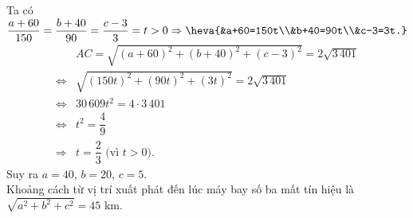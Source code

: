 \begin{bt}
{		Ta có $\dfrac{a+60}{150}=\dfrac{b+40}{90}=\dfrac{c-3}{3}=t>0\Rightarrow \heva{&a+60=150t\\&b+40=90t\\&c-3=3t.}$
		\allowdisplaybreaks
		\begin{align*}
			&A C=\sqrt{(a+60)^2+(b+40)^2+(c-3)^2}=2 \sqrt{3\,401}\\
			\Leftrightarrow &\sqrt{(150 t)^2+(90 t)^2+(3 t)^2}=2 \sqrt{3\,401} \\
			\Leftrightarrow &30\,609 t^2=4 \cdot 3\,401\\
			\Leftrightarrow & t^2=\dfrac{4}{9} \\
			\Rightarrow &t=\dfrac{2}{3} \text{ (vì $t>0$)}.
		\end{align*}
		Suy ra $a=40$, $b=20$, $c=5$.\\
		Khoảng cách từ vị trí xuất phát đến lúc máy bay số ba mất tín hiệu là $\sqrt{a^2+b^2+c^2}=45$ km.
		
	}
\end{bt}

